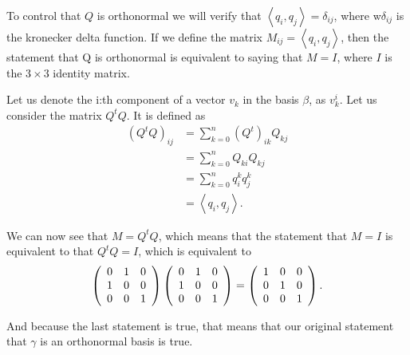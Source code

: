 \documentclass[10pt]{article}
\begin{document}
\begin{solution}[1]
To control that \(Q\) is orthonormal we will verify that \(\left< q_i, q_j \right> = \delta _{ij}\),
where  w\(\delta _{ij}\) is the kronecker delta function.
If we define the matrix \(M _{ij} = \left< q_i , q_j \right>\), then the statement that Q is orthonormal
is equivalent to saying that \(M = I\), where \(I\) is the \(3 \times 3\) identity matrix.

Let us denote the i:th component of a vector \(v_k\) in the basis \(\beta\), as
\(v _{k}^{i}\). Let us consider the matrix \(Q^{t} Q\). It is defined as
\begin{align*}
(Q^{t} Q) _{ij}  &  = \sum_{ k = 0 }^{ n } (Q^{t}) _{ik} Q _{kj} \\
& = \sum_{ k = 0 }^{ n } Q _{ki} Q _{kj} \\
& = \sum_{ k = 0 }^{ n } q _{i}^{k} q _{j}^{k} \\
& = \left< q_i , q_j \right> 
.
\end{align*}

We can now see that \(M = Q^{t} Q\), which means that the statement that
\(M = I\) is equivalent to that \(Q^{t} Q = I\), which is equivalent to
\begin{align*}
\left( \begin{array}{c c c}
0  &  1  &  0 \\
1  &  0  &  0 \\
0  &  0  &  1
\end{array} \right)
\left( \begin{array}{c c c}
0  &  1  &  0 \\
1  &  0  &  0 \\
0  &  0  &  1
\end{array} \right)
=
\left( \begin{array}{c c c}
1  &  0  &  0 \\
0  &  1  &  0 \\
0  &  0  &  1
\end{array} \right)
.
\end{align*}

And because the last statement is true, that means that our original
statement that \(\gamma\) is an orthonormal basis is true.
\end{solution}
\end{document}
